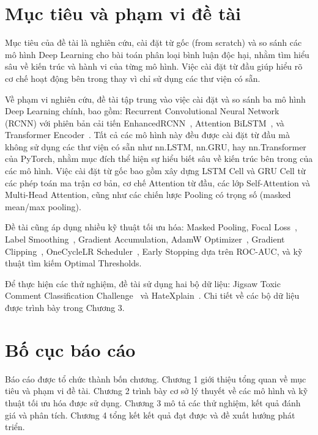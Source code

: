 \documentclass[../BTL.tex]{subfiles}
\begin{document}
\section{Mục tiêu và phạm vi đề tài}
\label{section:1.2}

Mục tiêu của đề tài là nghiên cứu, cài đặt từ gốc (from scratch) và so sánh các mô hình Deep Learning cho bài toán phân loại bình luận độc hại, nhằm tìm hiểu sâu về kiến trúc và hành vi của từng mô hình. Việc cài đặt từ đầu giúp hiểu rõ cơ chế hoạt động bên trong thay vì chỉ sử dụng các thư viện có sẵn.

Về phạm vi nghiên cứu, đề tài tập trung vào việc cài đặt và so sánh ba mô hình Deep Learning chính, bao gồm: Recurrent Convolutional Neural Network (RCNN) với phiên bản cải tiến EnhancedRCNN~\cite{lai2015rcnn}, Attention BiLSTM~\cite{yang2016hierarchical}, và Transformer Encoder~\cite{vaswani2017transformer}. Tất cả các mô hình này đều được cài đặt từ đầu mà không sử dụng các thư viện có sẵn như nn.LSTM, nn.GRU, hay nn.Transformer của PyTorch, nhằm mục đích thể hiện sự hiểu biết sâu về kiến trúc bên trong của các mô hình. Việc cài đặt từ gốc bao gồm xây dựng LSTM Cell và GRU Cell từ các phép toán ma trận cơ bản, cơ chế Attention từ đầu, các lớp Self-Attention và Multi-Head Attention, cũng như các chiến lược Pooling có trọng số (masked mean/max pooling).

Đề tài cũng áp dụng nhiều kỹ thuật tối ưu hóa: Masked Pooling, Focal Loss~\cite{lin2017focal}, Label Smoothing~\cite{szegedy2016rethinking}, Gradient Accumulation, AdamW Optimizer~\cite{loshchilov2017adamw}, Gradient Clipping~\cite{graves2012supervised}, OneCycleLR Scheduler~\cite{smith2018superconvergence}, Early Stopping dựa trên ROC-AUC, và kỹ thuật tìm kiếm Optimal Thresholds.

Để thực hiện các thử nghiệm, đề tài sử dụng hai bộ dữ liệu: Jigsaw Toxic Comment Classification Challenge~\cite{kaggleJigsaw} và HateXplain~\cite{hatexplain2021}. Chi tiết về các bộ dữ liệu được trình bày trong Chương 3.

\section{Bố cục báo cáo}
\label{section:1.4}
Báo cáo được tổ chức thành bốn chương. Chương 1 giới thiệu tổng quan về mục tiêu và phạm vi đề tài. Chương 2 trình bày cơ sở lý thuyết về các mô hình và kỹ thuật tối ưu hóa được sử dụng. Chương 3 mô tả các thử nghiệm, kết quả đánh giá và phân tích. Chương 4 tổng kết kết quả đạt được và đề xuất hướng phát triển.
\end{document}
